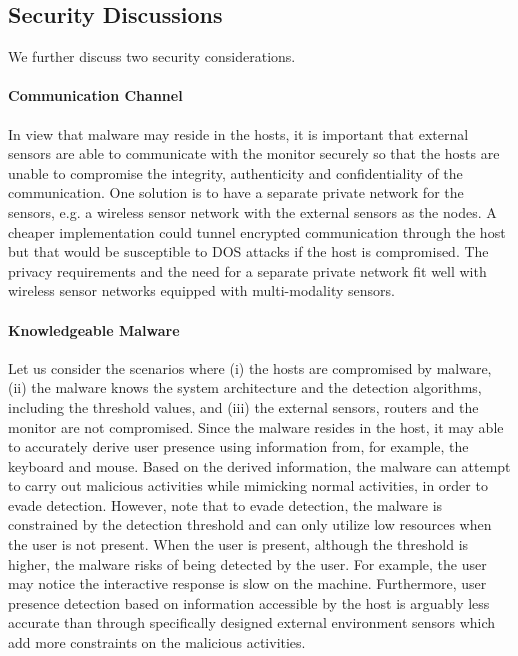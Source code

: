 %

\subsection{Security Discussions}

We further discuss two security considerations.

\paragraph{Communication Channel}

In view that malware may reside in the hosts,
it is important that external sensors are able to communicate with
the monitor securely so that the hosts are unable to compromise
the integrity, authenticity and confidentiality of the communication.
One solution is to have a separate private network for the sensors,
e.g. a wireless sensor network with the external sensors as the nodes.
A cheaper implementation could tunnel encrypted communication
through the host but that would be susceptible to DOS attacks if
the host is compromised.
The privacy requirements and the need for a separate private
network fit well with wireless sensor networks equipped with
multi-modality sensors.

\paragraph{Knowledgeable Malware}

Let us consider the scenarios where
(i) the hosts are compromised by malware,
(ii) the malware knows the system architecture and the detection algorithms,
including the threshold values, and
(iii) the external sensors, routers and the monitor are not compromised.
Since the malware resides in the host, it may able
to accurately derive user presence using information from, for example,
the keyboard and mouse.
Based on the derived information, the malware can attempt
to carry out malicious activities while mimicking normal activities, in order
to evade detection.
However, note that to evade detection, the malware is
constrained by the detection threshold and can only utilize low resources when
the user is not present.
When the user is present, although the threshold is
higher, the malware risks of being detected by the user.
For example, the
user may notice the interactive response is slow on the machine.
Furthermore, user presence detection based on information accessible 
by the host is arguably less accurate than through specifically 
designed external environment
sensors which add more constraints on the malicious activities.
